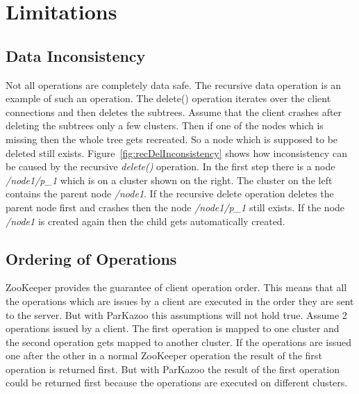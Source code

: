 \chapter{Limitations}

\section{Data Inconsistency}



Not all operations are completely data safe. The recursive data operation is an example of such an operation. The delete() operation iterates over the client connections and then deletes the subtrees. Assume that the client crashes after deleting the subtrees only a few clusters. Then if one of the nodes which is missing then the whole tree gets recreated. So a node which is supposed to be deleted still exists. Figure~\ref{fig:recDelInconsistency} shows how inconsistency can be caused by the recursive \textit{delete()} operation. In the first step there is a node \textit{/node1/p\_1} which is on a cluster shown on the right. The cluster on the left contains the parent node \textit{/node1}. If the recursive delete operation deletes the parent node first and crashes then the node \textit{/node1/p\_1} still exists. If the node \textit{/node1} is created again then the child gets automatically created.

\section{Ordering of Operations}
ZooKeeper provides the guarantee of client operation order. This means that all the operations which are issues by a client are executed in the order they are sent to the server. But with ParKazoo this assumptions will not hold true. Assume 2 operations issued by a client. The first operation is mapped to one cluster and the second operation gets mapped to another cluster. If the operations are issued one after the other in a normal ZooKeeper operation the result of the first operation is returned first. But with ParKazoo the result of the first operation could be returned first because the operations are executed on different clusters.
